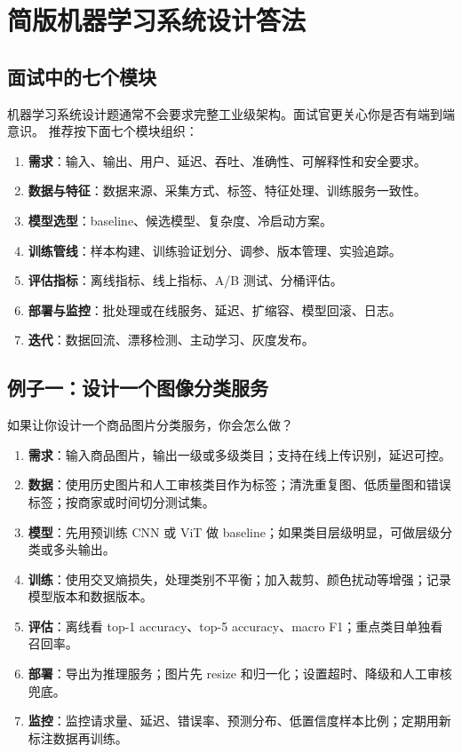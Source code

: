 \section{简版机器学习系统设计答法}
\subsection{面试中的七个模块}
机器学习系统设计题通常不会要求完整工业级架构。面试官更关心你是否有端到端意识。
推荐按下面七个模块组织：
\begin{enumerate}[leftmargin=2em]
  \item \textbf{需求}：输入、输出、用户、延迟、吞吐、准确性、可解释性和安全要求。
  \item \textbf{数据与特征}：数据来源、采集方式、标签、特征处理、训练服务一致性。
  \item \textbf{模型选型}：baseline、候选模型、复杂度、冷启动方案。
  \item \textbf{训练管线}：样本构建、训练验证划分、调参、版本管理、实验追踪。
  \item \textbf{评估指标}：离线指标、线上指标、A/B 测试、分桶评估。
  \item \textbf{部署与监控}：批处理或在线服务、延迟、扩缩容、模型回滚、日志。
  \item \textbf{迭代}：数据回流、漂移检测、主动学习、灰度发布。
\end{enumerate}
\subsection{例子一：设计一个图像分类服务}
\begin{interview}
如果让你设计一个商品图片分类服务，你会怎么做？
\end{interview}
\begin{answer}
\begin{enumerate}[leftmargin=2em]
  \item \textbf{需求}：输入商品图片，输出一级或多级类目；支持在线上传识别，延迟可控。
  \item \textbf{数据}：使用历史图片和人工审核类目作为标签；清洗重复图、低质量图和错误标签；按商家或时间切分测试集。
  \item \textbf{模型}：先用预训练 CNN 或 ViT 做 baseline；如果类目层级明显，可做层级分类或多头输出。
  \item \textbf{训练}：使用交叉熵损失，处理类别不平衡；加入裁剪、颜色扰动等增强；记录模型版本和数据版本。
  \item \textbf{评估}：离线看 top-1 accuracy、top-5 accuracy、macro F1；重点类目单独看召回率。
  \item \textbf{部署}：导出为推理服务；图片先 resize 和归一化；设置超时、降级和人工审核兜底。
  \item \textbf{监控}：监控请求量、延迟、错误率、预测分布、低置信度样本比例；定期用新标注数据再训练。
\end{enumerate}
\end{answer}

